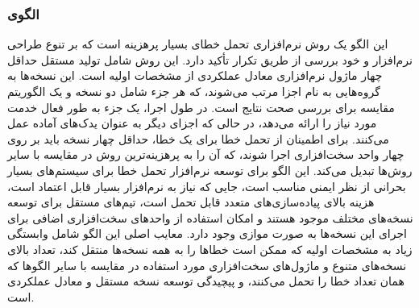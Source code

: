 \subsubsection{الگوی }
\label{ArmoushSWNSelfChkProgSec}
\begin{RTL}
این الگو یک روش نرم‌افزاری تحمل خطای بسیار پرهزینه است
که بر تنوع طراحی نرم‌افزار و خود بررسی از طریق تکرار تأکید دارد.
این روش شامل تولید مستقل حداقل چهار ماژول نرم‌افزاری معادل
عملکردی از مشخصات اولیه است.
این نسخه‌ها به گروه‌هایی به نام اجزا مرتب می‌شوند،
که هر جزء شامل دو نسخه و یک الگوریتم مقایسه برای بررسی صحت نتایج است.
در طول اجرا، یک جزء به طور فعال خدمت مورد نیاز را ارائه
می‌دهد، در حالی که اجزای دیگر به عنوان یدک‌های آماده عمل می‌کنند.
برای اطمینان از تحمل خطا برای یک خطا، حداقل چهار
نسخه باید بر روی چهار واحد سخت‌افزاری اجرا شوند، که آن
را به پرهزینه‌ترین روش در مقایسه با سایر روش‌ها تبدیل
می‌کند. این الگو برای توسعه نرم‌افزار تحمل خطا برای
سیستم‌های بسیار بحرانی از نظر ایمنی مناسب است، جایی که نیاز
به نرم‌افزار بسیار قابل اعتماد است، هزینه بالای پیاده‌سازی‌های
متعدد قابل تحمل است، تیم‌های مستقل برای
توسعه نسخه‌های مختلف موجود هستند و امکان
استفاده از واحدهای سخت‌افزاری اضافی برای اجرای
این نسخه‌ها به صورت موازی وجود دارد. معایب اصلی این الگو
شامل وابستگی زیاد به مشخصات اولیه که ممکن است خطاها را به همه
نسخه‌ها منتقل کند، تعداد بالای نسخه‌های متنوع و
ماژول‌های سخت‌افزاری مورد استفاده در مقایسه با سایر
الگوها که همان تعداد خطا را تحمل می‌کنند،
و پیچیدگی توسعه  نسخه‌ مستقل و معادل عملکردی است.
\end{RTL}